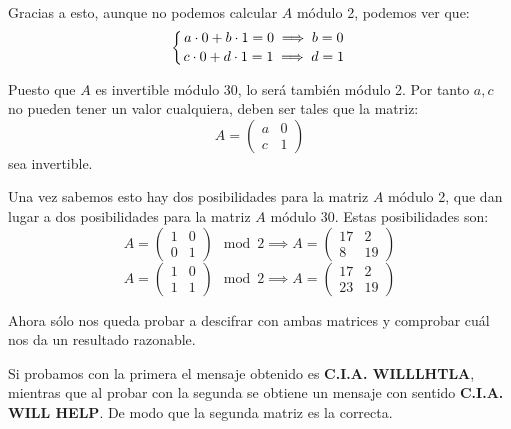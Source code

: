 Gracias a esto, aunque no podemos calcular $A$ módulo 2, podemos ver que:
\[\left\{  a \cdot 0 + b \cdot 1 = 0 \implies b = 0 \atop
 c \cdot 0 + d \cdot 1 = 1 \implies d = 1\right.\]

 Puesto que $A$ es invertible módulo 30, lo será también módulo 2. Por tanto $a,c$ no pueden tener un valor cualquiera, deben ser tales que la matriz:
 \[A = \left( \begin{array}{cc}
	a & 0 \\
	c & 1
	\end{array} \right)\]
sea invertible.

Una vez sabemos esto hay dos posibilidades para la matriz $A$ módulo 2, que dan lugar a dos posibilidades para la matriz $A$ módulo 30. Estas posibilidades son:
\[A = \left( \begin{array}{cc}
	1 & 0 \\
	0 & 1
	\end{array} \right) \mod 2 \implies A = \left( \begin{array}{cc}
	17 & 2 \\
	8 & 19
	\end{array} \right)\]
\[A = \left( \begin{array}{cc}
	1 & 0 \\
	1 & 1
	\end{array} \right) \mod 2 \implies A = \left( \begin{array}{cc}
	17 & 2 \\
	23 & 19
	\end{array} \right)\]

Ahora sólo nos queda probar a descifrar con ambas matrices y comprobar cuál nos da un resultado razonable.

Si probamos con la primera el mensaje obtenido es \textbf{C.I.A. WILLLHTLA}, mientras que al probar con la segunda se obtiene un mensaje con sentido \textbf{C.I.A. WILL HELP}. De modo que la segunda matriz es la correcta.


